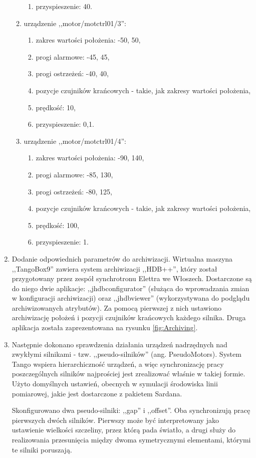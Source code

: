 \begin{enumerate}
\begin{enumerate}
\begin{enumerate}
			\item przyspieszenie: 40.
		\end{enumerate}
		\item urządzenie ,,motor/motctrl01/3'':
		\begin{enumerate}
			\item zakres wartości położenia: -50, 50,
			\item progi alarmowe: -45, 45,
			\item progi ostrzeżeń: -40, 40,
			\item pozycje czujników krańcowych - takie, jak zakresy wartości położenia,
			\item prędkość: 10,
			\item przyspieszenie: 0,1.
		\end{enumerate}
		\item urządzenie ,,motor/motctrl01/4'':
		\begin{enumerate}
			\item zakres wartości położenia: -90, 140,
			\item progi alarmowe: -85, 130,
			\item progi ostrzeżeń: -80, 125,
			\item pozycje czujników krańcowych - takie, jak zakresy wartości położenia,
			\item prędkość: 100,
			\item przyspieszenie: 1.
		\end{enumerate}
	\end{enumerate}
	
	\item Dodanie odpowiednich parametrów do archiwizacji. Wirtualna maszyna ,,TangoBox9'' zawiera system archiwizacji ,,HDB++'', który został przygotowany przez zespół synchrotronu Elettra we Włoszech. Dostarczone są do niego dwie aplikacje: ,,jhdbconfigurator'' (służąca do wprowadzania zmian w konfiguracji archiwizacji) oraz ,,jhdbviewer'' (wykorzystywana do podglądu archiwizowanych atrybutów). Za pomocą pierwszej z nich ustawiono archiwizację położeń i pozycji czujników krańcowych każdego silnika. Druga aplikacja została zaprezentowana na rysunku \ref{fig:Archiving}.
	
	\item Następnie dokonano sprawdzenia działania urządzeń nadrzędnych nad zwykłymi silnikami - tzw. ,,pseudo-silników'' (ang. PseudoMotors). System Tango wspiera hierarchiczność urządzeń, a więc synchronizację pracy poszczególnych silników najprościej jest zrealizować właśnie w takiej formie. Użyto domyślnych ustawień, obecnych w symulacji środowiska linii pomiarowej, jakie jest dostarczone z pakietem Sardana.
	
	Skonfigurowano dwa pseudo-silniki: ,,gap'' i ,,offset''. Oba synchronizują pracę pierwszych dwóch silników. Pierwszy może być interpretowany jako ustawienie wielkości szczeliny, przez którą pada światło, a drugi służy do realizowania przesunięcia między dwoma symetrycznymi elementami, którymi te silniki poruszają.
\end{enumerate}

